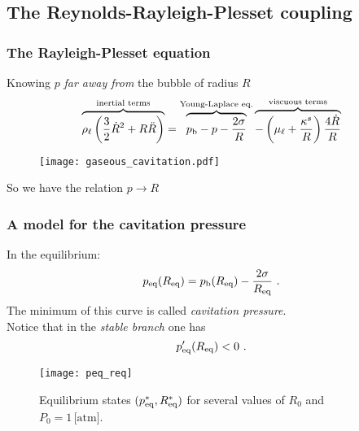 \documentclass[10pt,aspectratio=169]{beamer}
\begin{document}
\subsection{The Reynolds-Rayleigh-Plesset coupling}

\begin{frame}
\frametitle{The Rayleigh-Plesset equation}
\vspace*{1.0cm}
\hspace*{-0.5cm}
\begin{minipage}{0.4\textwidth}
Knowing $p$ \emph{far away from} the bubble of radius $R$
\begin{equation*}
\overbrace{\rho_\ell\left(\frac{3}{2}\dot{R}^2+R\ddot{R}\right)}^{\text{inertial terms}}=\overbrace{p_\textnormal{b}-p-\frac{2\sigma}{R}}^{\text{Young-Laplace eq.}}\overbrace{-\left(\mu_\ell+\frac{\kappa^s}{R}\right)\frac{4\dot{R}}{R}}^{\text{viscuous terms}}
\end{equation*}
\end{minipage}%
\hspace*{0.8cm}
\begin{minipage}{0.5\textwidth}
\begin{figure}[h]
	\texttt{[image: gaseous\_cavitation.pdf]}
\end{figure}
\end{minipage}
\begin{center}
So we have the relation $p\longrightarrow R$
\end{center}
\end{frame}

\begin{frame}
\frametitle{A model for the cavitation pressure}
\begin{minipage}{0.3\textwidth}
In the equilibrium:
$$p_{\textnormal{{eq}}}(R_{\textnormal{{eq}}})=p_\textnormal{b}(R_{\textnormal{{eq}}})-\frac{2\sigma}{R_{\textnormal{{eq}}}}~.$$
The minimum of this curve is called \emph{cavitation pressure}.\\

Notice that in the \emph{stable branch} one has $$p_{\textnormal{{eq}}}'(R_{\textnormal{{eq}}})<0~.$$
\end{minipage}%
\hspace*{0.5cm}
\begin{minipage}{0.5\textwidth}\vspace*{1.0cm}
	\begin{figure}
	\texttt{[image: peq\_req]}
	\caption{Equilibrium states $(p_{\textnormal{{eq}}}^*,R_{\textnormal{{eq}}}^*)$ for several values of $R_0$ and $P_0=1\,\mbox{[atm]}$.}
\end{figure}
\end{minipage}
\end{frame}
\end{document}
